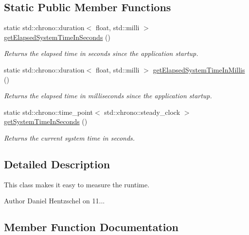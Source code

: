 \subsection*{Static Public Member Functions}
\begin{DoxyCompactItemize}
\item 
static std\+::chrono\+::duration$<$ float, std\+::milli $>$ \mbox{\hyperlink{class_stopwatch_a15494cf73d00c146c5151e348d9a5326}{get\+Elapsed\+System\+Time\+In\+Seconds}} ()
\begin{DoxyCompactList}\small\item\em Returns the elapsed time in seconds since the application startup. \end{DoxyCompactList}\item 
static std\+::chrono\+::duration$<$ float, std\+::milli $>$ \mbox{\hyperlink{class_stopwatch_af7edf796a45302f8dcee3ab784aa60ad}{get\+Elapsed\+System\+Time\+In\+Millis}} ()
\begin{DoxyCompactList}\small\item\em Returns the elapsed time in milliseconds since the application startup. \end{DoxyCompactList}\item 
static std\+::chrono\+::time\+\_\+point$<$ std\+::chrono\+::steady\+\_\+clock $>$ \mbox{\hyperlink{class_stopwatch_aed8349df72b0a516d6d43022414d8620}{get\+System\+Time\+In\+Seconds}} ()
\begin{DoxyCompactList}\small\item\em Returns the current system time in seconds. \end{DoxyCompactList}\end{DoxyCompactItemize}


\subsection{Detailed Description}
This class makes it easy to measure the runtime. 

\begin{DoxyAuthor}{Author}
Daniel Hentzschel on 11... 
\end{DoxyAuthor}


\subsection{Member Function Documentation}
\mbox{\label{class_stopwatch_af7edf796a45302f8dcee3ab784aa60ad}} 
